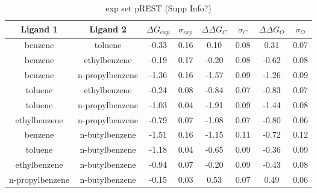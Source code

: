 \documentclass[T4paper.tex]{subfiles}
\begin{document}
\begin{table}[]
\centering
\caption{exp set pREST (Supp Info?)}
\label{tbl:exp_pREST_set}
\begin{tabular}{|c|c|c|c|c|c|c|c|}
\hline
\textbf{Ligand 1}                                & \textbf{Ligand 2}                                & \boldmath$\Delta G_{exp}$  & \boldmath$\sigma_{exp}$ & {\color[HTML]{800080} \boldmath$\Delta\Delta G_{C}$} & {\color[HTML]{800080} \boldmath$\sigma_{C}$} & {\color[HTML]{008000} \boldmath$\Delta\Delta G_{O}$} & {\color[HTML]{008000} \boldmath$\sigma_{O}$} \\ \hline
\cellcolor[HTML]{800080}benzene         & \cellcolor[HTML]{800080}toluene         & -0.33        & 0.16            & 0.10       & 0.08          & 0.31       & 0.07          \\ \hline
\cellcolor[HTML]{800080}benzene         & \cellcolor[HTML]{800080}ethylbenzene    &-0.19 & 0.17  & -0.20 & 0.08  & -0.62 & 0.08          \\ \hline
\cellcolor[HTML]{800080}benzene         & \cellcolor[HTML]{800080}n-propylbenzene & -1.36 & 0.16 & -1.57 & 0.09  & -1.26 & 0.09         \\ \hline
\cellcolor[HTML]{800080}toluene         & \cellcolor[HTML]{800080}ethylbenzene    & -0.24 & 0.08  & -0.84 & 0.07  & -0.83 & 0.07          \\ \hline
\cellcolor[HTML]{800080}toluene         & \cellcolor[HTML]{800080}n-propylbenzene & -1.03 & 0.04  & -1.91 & 0.09  & -1.44 & 0.08          \\ \hline
\cellcolor[HTML]{800080}ethylbenzene    & \cellcolor[HTML]{800080}n-propylbenzene & -0.79 & 0.07  & -1.08 & 0.07  & -0.80 & 0.06         \\ \hline
\cellcolor[HTML]{800080}benzene         & \cellcolor[HTML]{00FFFF}n-butylbenzene  & -1.51 & 0.16 & -1.15 & 0.11  & -0.72 & 0.12         \\ \hline
\cellcolor[HTML]{800080}toluene         & \cellcolor[HTML]{00FFFF}n-butylbenzene  & -1.18 & 0.04  & -0.65 & 0.09  & -0.36 & 0.09         \\ \hline
\cellcolor[HTML]{800080}ethylbenzene    & \cellcolor[HTML]{00FFFF}n-butylbenzene  & -0.94 & 0.07  & -0.20 & 0.09  & -0.43 & 0.08         \\ \hline
\cellcolor[HTML]{800080}n-propylbenzene & \cellcolor[HTML]{00FFFF}n-butylbenzene  & -0.15 & 0.03  & 0.53  & 0.07  & 0.49  & 0.06       \\ \hline
\end{tabular}
\end{table}
\end{document}
